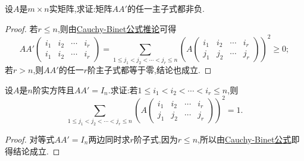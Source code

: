 \documentclass[../../main.tex]{subfiles}%
\begin{document}
\begin{example}
设\(A\)是\(m\times n\)实矩阵,求证:矩阵\(AA'\)的任一主子式都非负.
\end{example}
\begin{proof}
若\(r\leqslant  n\),则由\hyperref[corollary:Cauchy-Binet公式推论]{Cauchy-Binet公式推论}可得
\[
AA'\begin{pmatrix}
i_1 & i_2 & \cdots & i_r\\
i_1 & i_2 & \cdots & i_r
\end{pmatrix}=\sum_{1\leqslant  j_1<j_2<\cdots<j_r\leqslant  n}\left(A\begin{pmatrix}
i_1 & i_2 & \cdots & i_r\\
j_1 & j_2 & \cdots & j_r
\end{pmatrix}\right)^2\geqslant 0;
\]
若\(r > n\),则\(AA'\)的任一\(r\)阶主子式都等于零,结论也成立.
\end{proof}

\begin{example}
设\(A\)是\(n\)阶实方阵且\(AA' = I_n\).求证:若\(1\leqslant  i_1 < i_2 < \cdots < i_r\leqslant  n\),则
\[
\sum_{1\leqslant  j_1<j_2<\cdots<j_r\leqslant  n}\left(A\begin{pmatrix}
i_1 & i_2 & \cdots & i_r\\
j_1 & j_2 & \cdots & j_r
\end{pmatrix}\right)^2 = 1.
\]
\end{example}
\begin{proof}
对等式$AA' = I_n$两边同时求$r$阶子式,因为$r\leqslant  n$,所以由\hyperref[theorem:Cauchy-Binet公式]{Cauchy-Binet公式}即得结论成立.
\end{proof}
\end{document}
